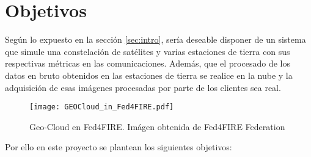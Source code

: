 
\section{Objetivos}
\label{sec:objetivos}

Según lo expuesto en la sección \ref{sec:intro}, sería deseable disponer de
un sistema que simule una constelación de satélites y varias estaciones de tierra con sus respectivas métricas en las comunicaciones. Además, que el procesado de los datos en bruto obtenidos en las estaciones de tierra se realice en la nube y la adquisición de esas imágenes procesadas por parte de los clientes sea real.

\begin{figure}
\begin{center}
\texttt{[image: GEOCloud\_in\_Fed4FIRE.pdf]}
\caption{Geo-Cloud en Fed4FIRE. Imágen obtenida de Fed4FIRE Federation}
\end{center}
\end{figure}

Por ello en este proyecto se plantean los siguientes objetivos:

